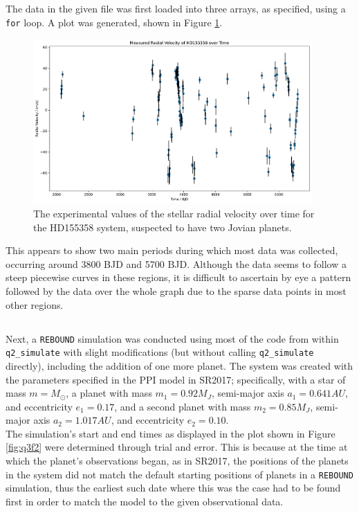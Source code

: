\documentclass{article}
\newcommand{\for}{\texttt{for}}
\newcommand{\rebound}{\texttt{REBOUND}}
\newcommand{\simf}{\texttt{q2\_simulate}}
\begin{document}
The data in the given file was first loaded into three arrays, as specified, using a \for{} loop. A plot was generated, shown in Figure \ref{fig:q3f1}.

\begin{figure}[htp]
    \centering
    \includegraphics[width=0.95\textwidth]{q3f1.pdf}
    \captionsetup{justification=centering}
    \caption{The experimental values of the stellar radial velocity over time for the HD155358 system, suspected to have two Jovian planets.}
    \label{fig:q3f1}
\end{figure}

This appears to show two main periods during which most data was collected, occurring around 3800 BJD and 5700 BJD. Although the data seems to follow a steep piecewise curves in these regions, it is difficult to ascertain by eye a pattern followed by the data over the whole graph due to the sparse data points in most other regions. 

\newpage

\subsection{}

Next, a \rebound{} simulation was conducted using most of the code from within \simf{} with slight modifications (but without calling \simf{} directly), including the addition of one more planet. The system was created with the parameters specified in the PPI model in SR2017; specifically, with a star of mass $m = M_\odot$, a planet with mass $m_1 = 0.92 \si{M_J}$, semi-major axis $a_1 = 0.641 \si{AU}$, and eccentricity $e_1 = 0.17$, and a second planet with mass $m_2 = 0.85 \si{M_J}$, semi-major axis $a_2 = 1.017 \si{AU}$, and eccentricity $e_2 = 0.10$.\\
The simulation's start and end times as displayed in the plot shown in Figure \ref{fig:q3f2} were determined through trial and error. This is because at the time at which the planet's observations began, as in SR2017, the positions of the planets in the system did not match the default starting positions of planets in a \rebound{} simulation, thus the earliest such date where this was the case had to be found first in order to match the model to the given observational data.
\end{document}

